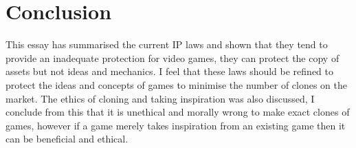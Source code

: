 \documentclass{scrartcl}
\begin{document}
\section*{Conclusion}
This essay has summarised the current IP laws and shown that they tend to provide an inadequate protection for video games, they can protect the copy of assets but not ideas and mechanics. I feel that these laws should be refined to protect the ideas and concepts of games to minimise the number of clones on the market. The ethics of cloning and taking inspiration was also discussed, I conclude from this that it is unethical and morally wrong to make exact clones of games, however if a game merely takes inspiration from an existing game then it can be beneficial and ethical.




\end{document}
